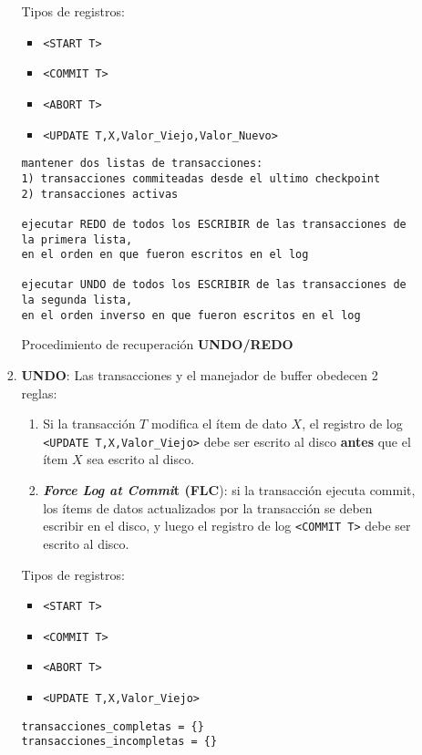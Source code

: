 \documentclass[a4paper, twoside]{article}
\begin{document}
\begin{itemize}
\begin{itemize}
\begin{enumerate}
Tipos de registros:
\begin{itemize}
\item \texttt{<START T>}
\item \texttt{<COMMIT T>}
\item \texttt{<ABORT T>}
\item \texttt{<UPDATE T,X,Valor\_Viejo,Valor\_Nuevo>}
\end{itemize}

\begin{algorithm}[H]
\begin{lstlisting}
mantener dos listas de transacciones:
1) transacciones commiteadas desde el ultimo checkpoint
2) transacciones activas

ejecutar REDO de todos los ESCRIBIR de las transacciones de la primera lista, 
en el orden en que fueron escritos en el log

ejecutar UNDO de todos los ESCRIBIR de las transacciones de la segunda lista, 
en el orden inverso en que fueron escritos en el log
\end{lstlisting}


\protect\caption{Procedimiento de recuperación \textbf{UNDO/REDO}}
\end{algorithm}


\item \textbf{UNDO}: Las transacciones y el manejador de buffer obedecen
2 reglas:

\begin{enumerate}
\item Si la transacción $T$ modifica el ítem de dato $X$, el registro
de log \texttt{<UPDATE T,X,Valor\_Viejo>} debe ser escrito al disco
\textbf{antes} que el ítem $X$ sea escrito al disco.
\item \textbf{\emph{Force Log at Commi}}\textbf{t (FLC}): si la transacción
ejecuta commit, los ítems de datos actualizados por la transacción
se deben escribir en el disco, y luego el registro de log \texttt{<COMMIT
T>} debe ser escrito al disco.
\end{enumerate}

Tipos de registros:
\begin{itemize}
\item \texttt{<START T>}
\item \texttt{<COMMIT T>}
\item \texttt{<ABORT T>}
\item \texttt{<UPDATE T,X,Valor\_Viejo>}
\end{itemize}

\begin{algorithm}[H]
\begin{lstlisting}
transacciones_completas = {}
transacciones_incompletas = {}


\end{lstlisting}
\end{algorithm}
\end{enumerate}
\end{itemize}
\end{itemize}
\end{document}
